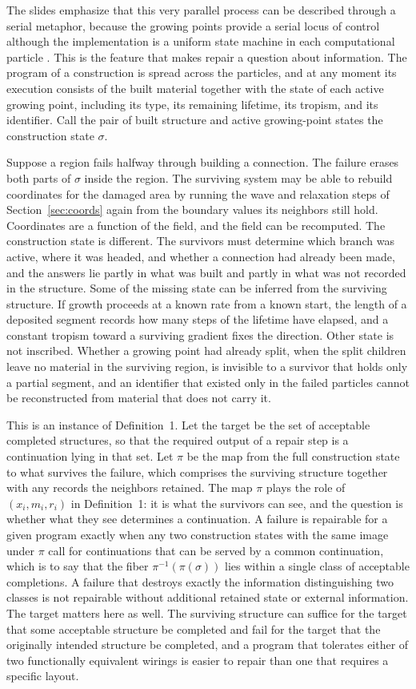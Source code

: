 \documentclass[11pt]{article}
\theoremstyle{definition}
\theoremstyle{plain}
\theoremstyle{remark}
\begin{document}
The slides emphasize that this very parallel process can be described through a serial metaphor, because the growing points provide a serial locus of control although the implementation is a uniform state machine in each computational particle \cite{darpa1998}. This is the feature that makes repair a question about information. The program of a construction is spread across the particles, and at any moment its execution consists of the built material together with the state of each active growing point, including its type, its remaining lifetime, its tropism, and its identifier. Call the pair of built structure and active growing-point states the construction state $\sigma$.

Suppose a region fails halfway through building a connection. The failure erases both parts of $\sigma$ inside the region. The surviving system may be able to rebuild coordinates for the damaged area by running the wave and relaxation steps of Section~\ref{sec:coords} again from the boundary values its neighbors still hold. Coordinates are a function of the field, and the field can be recomputed. The construction state is different. The survivors must determine which branch was active, where it was headed, and whether a connection had already been made, and the answers lie partly in what was built and partly in what was not recorded in the structure. Some of the missing state can be inferred from the surviving structure. If growth proceeds at a known rate from a known start, the length of a deposited segment records how many steps of the lifetime have elapsed, and a constant tropism toward a surviving gradient fixes the direction. Other state is not inscribed. Whether a growing point had already split, when the split children leave no material in the surviving region, is invisible to a survivor that holds only a partial segment, and an identifier that existed only in the failed particles cannot be reconstructed from material that does not carry it.

This is an instance of Definition~1. Let the target be the set of acceptable completed structures, so that the required output of a repair step is a continuation lying in that set. Let $\pi$ be the map from the full construction state to what survives the failure, which comprises the surviving structure together with any records the neighbors retained. The map $\pi$ plays the role of $(x_i,m_i,r_i)$ in Definition~1: it is what the survivors can see, and the question is whether what they see determines a continuation. A failure is repairable for a given program exactly when any two construction states with the same image under $\pi$ call for continuations that can be served by a common continuation, which is to say that the fiber $\pi^{-1}(\pi(\sigma))$ lies within a single class of acceptable completions. A failure that destroys exactly the information distinguishing two classes is not repairable without additional retained state or external information. The target matters here as well. The surviving structure can suffice for the target that some acceptable structure be completed and fail for the target that the originally intended structure be completed, and a program that tolerates either of two functionally equivalent wirings is easier to repair than one that requires a specific layout.
\end{document}
